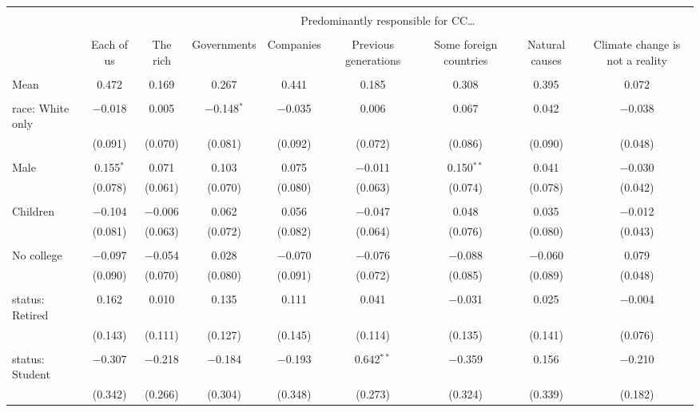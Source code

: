 
\begin{tabular}{@{\extracolsep{5pt}}lcccccccc} 
\\[-1.8ex]\hline 
\hline \\[-1.8ex] 
 & \multicolumn{8}{c}{Predominantly responsible for CC…} \\ 
\cline{2-9} 
\\[-1.8ex] & Each of us & The rich & Governments & Companies & Previous generations & Some foreign countries & Natural causes & Climate change is not a reality \\ 
\hline \\[-1.8ex] 
 Mean & 0.472 & 0.169 & 0.267 & 0.441 & 0.185 & 0.308 & 0.395 & 0.072  \\ \hline \\[-1.8ex] race: White only & $-$0.018 & 0.005 & $-$0.148$^{*}$ & $-$0.035 & 0.006 & 0.067 & 0.042 & $-$0.038 \\ 
  & (0.091) & (0.070) & (0.081) & (0.092) & (0.072) & (0.086) & (0.090) & (0.048) \\ 
  & & & & & & & & \\ 
 Male & 0.155$^{*}$ & 0.071 & 0.103 & 0.075 & $-$0.011 & 0.150$^{**}$ & 0.041 & $-$0.030 \\ 
  & (0.078) & (0.061) & (0.070) & (0.080) & (0.063) & (0.074) & (0.078) & (0.042) \\ 
  & & & & & & & & \\ 
 Children & $-$0.104 & $-$0.006 & 0.062 & 0.056 & $-$0.047 & 0.048 & 0.035 & $-$0.012 \\ 
  & (0.081) & (0.063) & (0.072) & (0.082) & (0.064) & (0.076) & (0.080) & (0.043) \\ 
  & & & & & & & & \\ 
 No college & $-$0.097 & $-$0.054 & 0.028 & $-$0.070 & $-$0.076 & $-$0.088 & $-$0.060 & 0.079 \\ 
  & (0.090) & (0.070) & (0.080) & (0.091) & (0.072) & (0.085) & (0.089) & (0.048) \\ 
  & & & & & & & & \\ 
 status: Retired & 0.162 & 0.010 & 0.135 & 0.111 & 0.041 & $-$0.031 & 0.025 & $-$0.004 \\ 
  & (0.143) & (0.111) & (0.127) & (0.145) & (0.114) & (0.135) & (0.141) & (0.076) \\ 
  & & & & & & & & \\ 
 status: Student & $-$0.307 & $-$0.218 & $-$0.184 & $-$0.193 & 0.642$^{**}$ & $-$0.359 & 0.156 & $-$0.210 \\ 
  & (0.342) & (0.266) & (0.304) & (0.348) & (0.273) & (0.324) & (0.339) & (0.182) \\ 

\end{tabular}
